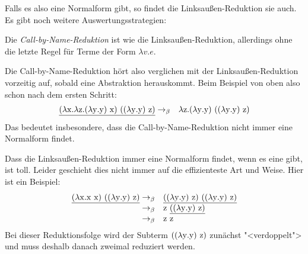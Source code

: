 %
Falls es also eine Normalform gibt, so findet die Linksaußen-Reduktion
sie auch.
Es gibt noch weitere Auswertungsstrategien:
%
\begin{definition}
  Die \textit{Call-by-Name-Reduktion} ist wie die
  Linksaußen-Reduktion, allerdings ohne die letzte Regel für Terme der
  Form $\lambda v.e$.
\end{definition}
%
Die Call-by-Name-Reduktion hört also verglichen mit der
Linksaußen-Reduktion vorzeitig auf, sobald eine Abstraktion
herauskommt.  Beim Beispiel von oben also schon nach dem ersten
Schritt:
%
\begin{eqnarray*}
  \underline{(\lambda \mathrm x.\lambda \mathrm z.(\lambda \mathrm y.\mathrm y)~\mathrm x)~((\lambda \mathrm y.\mathrm y)~\mathrm z)}
  &  \rightarrow_\beta &
                         \lambda \mathrm z.(\lambda \mathrm y.\mathrm y)~((\lambda \mathrm y.\mathrm y)~\mathrm z)
\end{eqnarray*}
%
Das bedeutet insbesondere, dass die Call-by-Name-Reduktion nicht immer
eine Normalform findet.

Dass die Linksaußen-Reduktion immer eine Normalform findet, wenn es
eine gibt, ist toll.  Leider geschieht dies nicht immer auf die
effizienteste Art und Weise.  Hier ist ein Beispiel:
%
\begin{displaymath}
  \begin{array}{rl}
  \underline{(\lambda \mathrm x.\mathrm x~\mathrm x)~((\lambda \mathrm y.\mathrm y)~\mathrm z)}
  \rightarrow_{\beta} & 
  \underline{((\lambda \mathrm y.\mathrm y)~\mathrm z)~((\lambda \mathrm y.\mathrm y)~\mathrm z)}
  \\
  \rightarrow_{\beta} & 
  \mathrm z~\underline{((\lambda \mathrm y.\mathrm y)~\mathrm z)}
  \\
  \rightarrow_{\beta} & 
  \mathrm z~\mathrm z
\end{array}
\end{displaymath}
%
Bei dieser Reduktionsfolge wird der Subterm $((\lambda \mathrm y.\mathrm y)~\mathrm z)$
zunächst "<verdoppelt"> und muss deshalb danach zweimal reduziert
werden.

